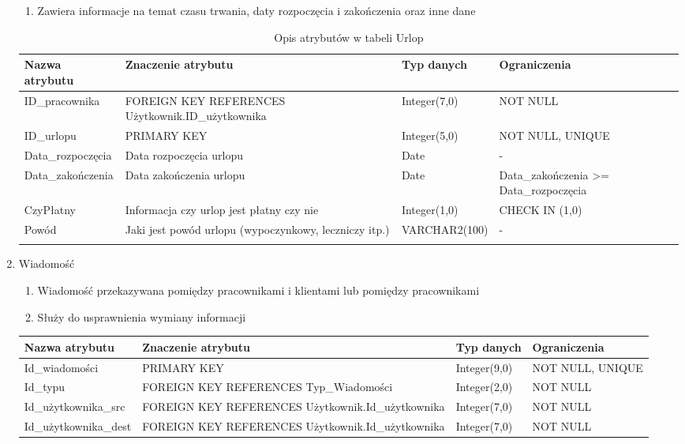 \begin{enumerate}
\begin{enumerate}
  	  \item Zawiera informacje na temat czasu trwania, daty rozpoczęcia i
  	  zakończenia oraz inne dane
  	\end{enumerate}
  	{\footnotesize
  	\begin{longtable}{|p{3cm}|p{5cm}|p{2.5cm}|p{2.5cm}|}
  	\hline
  	\textbf{Nazwa atrybutu} & \textbf{Znaczenie atrybutu} & \textbf{Typ danych} &
  	\textbf{Ograniczenia} \\
  	\hline
  	ID\_pracownika & FOREIGN KEY REFERENCES Użytkownik.ID\_użytkownika  &
  	Integer(7,0) & NOT NULL
  	\\
  	\hline
  	ID\_urlopu & PRIMARY KEY & Integer(5,0) & NOT NULL, UNIQUE  \\
  	\hline
  	Data\_rozpoczęcia & Data rozpoczęcia urlopu & Date & -  \\
  	\hline
  	Data\_zakończenia & Data zakończenia urlopu & Date & Data\_zakończenia >=
  	Data\_rozpoczęcia
  	\\
  	\hline
  	CzyPłatny & Informacja czy urlop jest płatny czy nie & Integer(1,0) & CHECK
  	IN (1,0) \\
  	\hline
  	Powód & Jaki jest powód urlopu (wypoczynkowy, leczniczy itp.) & VARCHAR2(100)
  	& - \\
  	\hline
	\caption{Opis atrybutów w tabeli Urlop}
	\end{longtable}}
  \item Wiadomość
  	\begin{enumerate}
  	  \item Wiadomość przekazywana pomiędzy pracownikami i klientami lub pomiędzy
  	  pracownikami
  	  \item Służy do usprawnienia wymiany informacji
  	\end{enumerate}
  	{\footnotesize
  	\begin{longtable}{|p{3.3cm}|p{5cm}|p{2.6cm}|p{2.5cm}|}
  	\hline
  	\textbf{Nazwa atrybutu} & \textbf{Znaczenie atrybutu} & \textbf{Typ danych} &
  	\textbf{Ograniczenia} \\
  	\hline
  	Id\_wiadomości & PRIMARY KEY & Integer(9,0) & NOT NULL, UNIQUE  \\
  	\hline
  	Id\_typu & FOREIGN KEY REFERENCES Typ\_Wiadomości & Integer(2,0) & NOT NULL \\
  	\hline
  	Id\_użytkownika\_src & FOREIGN KEY REFERENCES Użytkownik.Id\_użytkownika  &
  	Integer(7,0) & NOT NULL
  	\\
  	\hline
  	Id\_użytkownika\_dest & FOREIGN KEY REFERENCES Użytkownik.Id\_użytkownika &
  	Integer(7,0) & NOT NULL

\end{longtable}}
\end{enumerate}
